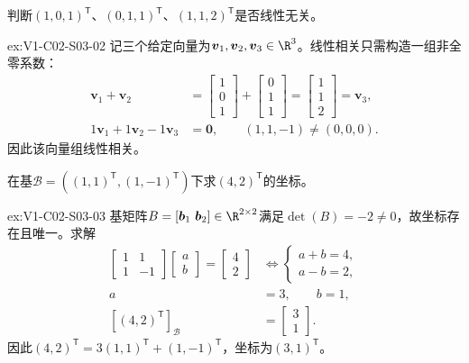 \begin{SLChapterExercisePairSection}
\begin{exercise}[线性相关]\label{ex:V1-C02-S03-02}
判断$(1,0,1)^{\mathsf T}$、$(0,1,1)^{\mathsf T}$、$(1,1,2)^{\mathsf T}$是否线性无关。
\end{exercise}
\label{sol:V1-C02-S03-02}
\begin{chapterexercisesolution}{ex:V1-C02-S03-02}
记三个给定向量为$\boldsymbol v_1,\boldsymbol v_2,\boldsymbol v_3\in\R^3$。线性相关只需构造一组非全零系数：
\[
\begin{aligned}
\boldsymbol v_1+\boldsymbol v_2
&=\begin{bmatrix}1\\0\\1\end{bmatrix}
+\begin{bmatrix}0\\1\\1\end{bmatrix}
=\begin{bmatrix}1\\1\\2\end{bmatrix}=\boldsymbol v_3,\\
1\boldsymbol v_1+1\boldsymbol v_2-1\boldsymbol v_3
&=\boldsymbol0,
\qquad (1,1,-1)\ne(0,0,0).
\end{aligned}
\]
因此该向量组线性相关。
\end{chapterexercisesolution}

\begin{exercise}[换基坐标]\label{ex:V1-C02-S03-03}
在基$\mathcal B=((1,1)^{\mathsf T},(1,-1)^{\mathsf T})$下求$(4,2)^{\mathsf T}$的坐标。
\end{exercise}
\label{sol:V1-C02-S03-03}
\begin{chapterexercisesolution}{ex:V1-C02-S03-03}
基矩阵$B=[\boldsymbol b_1\ \boldsymbol b_2]\in\R^{2\times2}$满足$\det(B)=-2\ne0$，故坐标存在且唯一。求解
\[
\begin{aligned}
\begin{bmatrix}1&1\\1&-1\end{bmatrix}
\begin{bmatrix}a\\b\end{bmatrix}
=\begin{bmatrix}4\\2\end{bmatrix}
&\Longleftrightarrow
\begin{cases}a+b=4,\\a-b=2,\end{cases}\\
a&=3,\qquad b=1,\\
[(4,2)^{\mathsf T}]_{\mathcal B}
&=\begin{bmatrix}3\\1\end{bmatrix}.
\end{aligned}
\]
因此$(4,2)^{\mathsf T}=3(1,1)^{\mathsf T}+(1,-1)^{\mathsf T}$，坐标为$(3,1)^{\mathsf T}$。
\end{chapterexercisesolution}


\end{SLChapterExercisePairSection}
